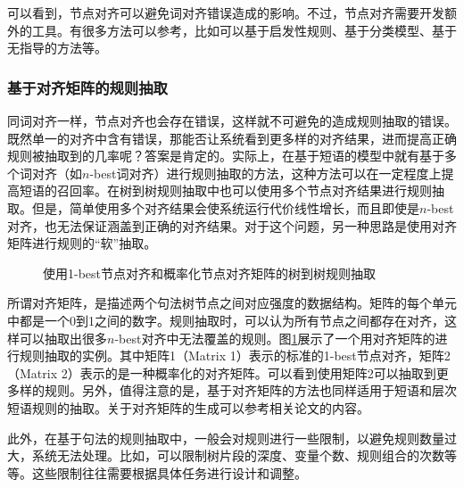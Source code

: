 \parinterval 可以看到，节点对齐可以避免词对齐错误造成的影响。不过，节点对齐需要开发额外的工具。有很多方法可以参考，比如可以基于启发性规则\cite{DBLP:conf/coling/GrovesHW04}、基于分类模型\cite{DBLP:conf/coling/SunZT10}、基于无指导的方法\cite{xiao2013unsupervised}等。


\subsubsection{基于对齐矩阵的规则抽取}

\parinterval 同词对齐一样，节点对齐也会存在错误，这样就不可避免的造成规则抽取的错误。既然单一的对齐中含有错误，那能否让系统看到更多样的对齐结果，进而提高正确规则被抽取到的几率呢？答案是肯定的。实际上，在基于短语的模型中就有基于多个词对齐（如$n$-best词对齐）进行规则抽取的方法，这种方法可以在一定程度上提高短语的召回率。在树到树规则抽取中也可以使用多个节点对齐结果进行规则抽取。但是，简单使用多个对齐结果会使系统运行代价线性增长，而且即使是$n$-best对齐，也无法保证涵盖到正确的对齐结果。对于这个问题，另一种思路是使用对齐矩阵进行规则的``软''抽取。

\begin{figure}[htp]
\centering

\caption{使用1-best节点对齐和概率化节点对齐矩阵的树到树规则抽取\cite{xiao2013unsupervised}}
\label{fig:4-63}
\end{figure}

\parinterval 所谓对齐矩阵，是描述两个句法树节点之间对应强度的数据结构。矩阵的每个单元中都是一个0到1之间的数字。规则抽取时，可以认为所有节点之间都存在对齐，这样可以抽取出很多$n$-best对齐中无法覆盖的规则。图\ref{fig:4-63}展示了一个用对齐矩阵的进行规则抽取的实例。其中矩阵1（Matrix 1）表示的标准的1-best节点对齐，矩阵2（Matrix 2）表示的是一种概率化的对齐矩阵。可以看到使用矩阵2可以抽取到更多样的规则。另外，值得注意的是，基于对齐矩阵的方法也同样适用于短语和层次短语规则的抽取。关于对齐矩阵的生成可以参考相关论文的内容\cite{xiao2013unsupervised,liu2009weighted,sun2010exploring,sun2010discriminative}。

\parinterval 此外，在基于句法的规则抽取中，一般会对规则进行一些限制，以避免规则数量过大，系统无法处理。比如，可以限制树片段的深度、变量个数、规则组合的次数等等。这些限制往往需要根据具体任务进行设计和调整。

